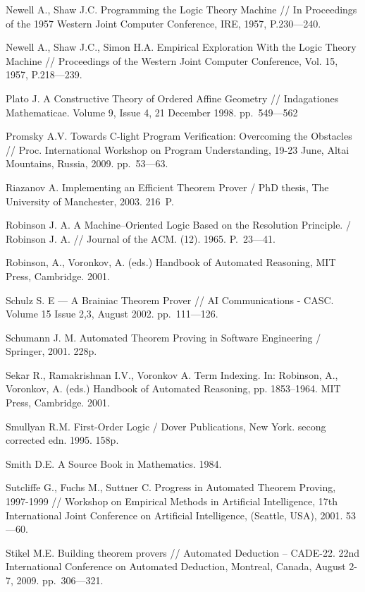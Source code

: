 \begin{thebibliography}{99}
 Newell A., Shaw J.C. Programming the Logic Theory Machine // In Proceedings of the 1957 Western Joint Computer Conference, IRE, 1957, P.230---240.

 Newell A., Shaw J.C., Simon H.A. Empirical Exploration With the Logic Theory Machine // Proceedings of the Western Joint Computer Conference, Vol. 15, 1957, P.218---239.

 Plato J. A Constructive Theory of Ordered Affine Geometry // Indagationes Mathematicae. Volume 9, Issue 4, 21 December 1998. pp.~549---562

 Promsky A.V. Towards C-light Program Verification: Overcoming the Obstacles // Proc. International Workshop on Program Understanding, 19-23 June, Altai Mountains, Russia, 2009. pp.~53---63.

 Riazanov A. Implementing an Efficient Theorem Prover /  PhD thesis, The University of Manchester, 2003. 216~P.

 Robinson J. A. A Machine--Oriented Logic Based on the Resolution Principle. / Robinson J. A. //  Journal of the ACM. (12). 1965. P.~23---41.

 Robinson, A., Voronkov, A. (eds.) Handbook of Automated Reasoning, MIT Press, Cambridge. 2001.

 Schulz S. E --- A Brainiac Theorem Prover // AI Communications - CASC. Volume 15 Issue 2,3, August 2002. pp.~111---126.

 Schumann J. M. Automated Theorem Proving in Software Engineering / Springer, 2001. 228p.

 Sekar R., Ramakrishnan I.V., Voronkov A. Term Indexing. In: Robinson, A., Voronkov, A. (eds.) Handbook of Automated Reasoning, pp. 1853--1964. MIT Press, Cambridge. 2001.

 Smullyan R.M. First-Order Logic / Dover Publications, New York. secong corrected edn. 1995. 158p.  

 Smith D.E. A Source Book in Mathematics. 1984.

 Sutcliffe G., Fuchs M., Suttner C. Progress in Automated Theorem Proving, 1997-1999 // Workshop on Empirical Methods in Artificial Intelligence, 17th International Joint Conference on Artificial Intelligence, (Seattle, USA), 2001. 53---60.

 Stikel M.E. Building theorem provers // Automated Deduction – CADE-22. 22nd International Conference on Automated Deduction, Montreal, Canada, August 2-7, 2009. pp.~306---321.


\end{thebibliography}
